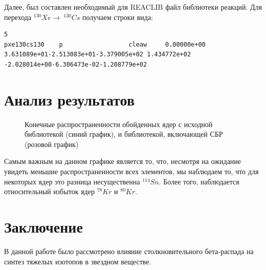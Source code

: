 \documentclass[14pt, a4paper]{article}
\begin{document}
Далее, был составлен необходимый для REACLIB файл библиотеки реакций. Для перехода $^{130}Xe \to \ ^{130}Cs$ получаем строки вида: 

\begin{lstlisting}[label={lst:label}]
5
pxe130cs130    p                  cleaw     0.00000e+00          
3.631089e+01-2.513083e+01-3.379005e+02 1.434772e+02                      
-2.028014e+00-6.306473e-02-1.208779e+02                                   

\end{lstlisting}


\section{Анализ результатов}

\begin{figure}[ht]
	\caption{Конечные распространенности обойденных ядер с исходной библиотекой (синий график), и библиотекой, включающей СБР (розовой график)}
	\label{ris:result}
\end{figure}

Самым важным на данном графике является то, что, несмотря на ожидание увидеть меньшие распространенности всех элементов, мы наблюдаем то, что для некоторых ядер это разница несущественна $^{114}Sn$. Более того, наблюдается относительный избыток ядер $^{78}Kr$ и $^{80}Kr$.

\section*{\centering Заключение}
В данной работе было рассмотрено влияние столкновительного бета-распада на синтез тяжелых изотопов в звездном веществе.
\end{document}
